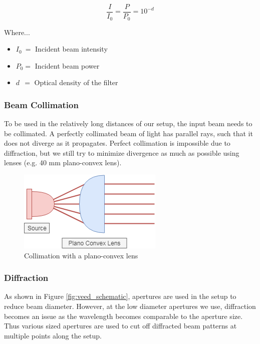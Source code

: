 \documentclass{article}
\begin{document}
    \begin{equation}
        \frac{I}{I_0} = \frac{P}{P_0} = 10^{-d}
    \end{equation}
    
    Where...
    \begin{itemize}
        \item $I_0 \ = $ Incident beam intensity
        \item $P_0 = $ Incident beam power
        \item $d \ \ = $ Optical density of the filter
    \end{itemize}
    
    \subsubsection{Beam Collimation}
    
    To be used in the relatively long distances of our setup, the input beam needs to be collimated. A perfectly collimated beam of light has parallel rays, such that it does not diverge as it propagates. Perfect collimation is impossible due to diffraction, but we still try to minimize divergence as much as possible using lenses (e.g. 40 mm plano-convex lens).
    
    \begin{figure}[h]
        \centering
        \includegraphics[scale=0.5]{img/collimation}
        \caption{Collimation with a plano-convex lens}
        \label{fig:collimation}
    \end{figure}
    
    \subsubsection{Diffraction}
    
    As shown in Figure \ref{fig:veed_schematic}, apertures are used in the setup to reduce beam diameter. However, at the low diameter apertures we use, diffraction becomes an issue as the wavelength becomes comparable to the aperture size. Thus various sized apertures are used to cut off diffracted beam patterns at multiple points along the setup.
    
\end{document}
